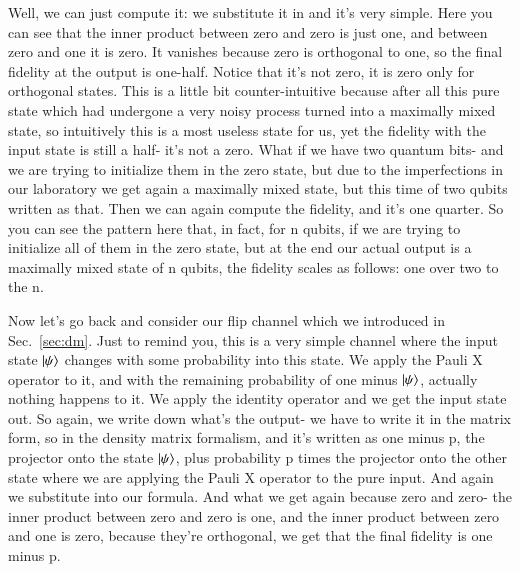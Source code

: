 Well, we can just compute it: we substitute it in and it's very simple. Here you can see that the inner product between zero and zero is just one, and between zero and one it is zero. It vanishes because zero is orthogonal to one, so the final fidelity at the output is one-half. Notice that it's not zero, it is zero only for orthogonal states. This is a little bit counter-intuitive because after all this pure state which had undergone a very noisy process turned into a maximally mixed state, so intuitively this is a most useless state for us, yet the fidelity with the input state is still a half- it's not a zero. What if we have two quantum bits- and we are trying to initialize them in the zero state, but due to the imperfections in our laboratory we get again a maximally mixed state, but this time of two qubits written as that. Then we can again compute the fidelity, and it's one quarter. So you can see the pattern here that, in fact, for n qubits, if we are trying to initialize all of them in the zero state, but at the end our actual output is a maximally mixed state of n qubits, the fidelity scales as follows: one over two to the n.

Now let's go back and consider our flip channel which we introduced in Sec.~\ref{sec:dm}. Just to remind you, this is a very simple channel where the input state $\ket{\psi}$ changes with some probability into this state. We apply the Pauli X operator to it, and with the remaining probability of one minus $\ket{\psi}$, actually nothing happens to it. We apply the identity operator and we get the input state out. So again, we write down what's the output- we have to write it in the matrix form, so in the density matrix formalism, and it's written as one minus p, the projector onto the state $\ket{\psi}$, plus probability p times the projector onto the other state where we are applying the Pauli X operator to the pure input. And again we substitute into our formula. And what we get again because zero and zero- the inner product between zero and zero is one, and the inner product between zero and one is zero, because they're orthogonal, we get that the final fidelity is one minus p.

